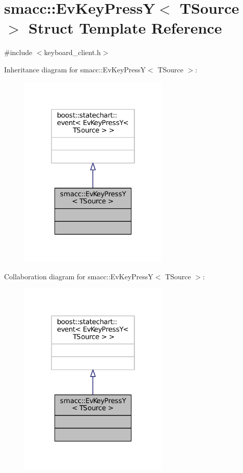 \hypertarget{structsmacc_1_1EvKeyPressY}{}\section{smacc\+:\+:Ev\+Key\+PressY$<$ T\+Source $>$ Struct Template Reference}
\label{structsmacc_1_1EvKeyPressY}


{\ttfamily \#include $<$keyboard\+\_\+client.\+h$>$}



Inheritance diagram for smacc\+:\+:Ev\+Key\+PressY$<$ T\+Source $>$\+:
\nopagebreak
\begin{figure}[H]
\begin{center}
\leavevmode
\includegraphics[width=202pt]{structsmacc_1_1EvKeyPressY__inherit__graph}
\end{center}
\end{figure}


Collaboration diagram for smacc\+:\+:Ev\+Key\+PressY$<$ T\+Source $>$\+:
\nopagebreak
\begin{figure}[H]
\begin{center}
\leavevmode
\includegraphics[width=202pt]{structsmacc_1_1EvKeyPressY__coll__graph}
\end{center}
\end{figure}


